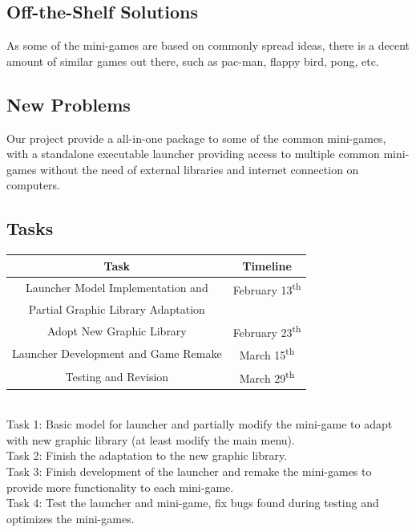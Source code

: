 \documentclass[12pt, titlepage]{article}
\begin{document}
\subsection{Off-the-Shelf Solutions}

As some of the mini-games are based on commonly spread ideas, there is a decent amount of similar games out there, such as pac-man, flappy bird, pong, etc.

\subsection{New Problems}

Our project provide a all-in-one package to some of the common mini-games, with a standalone executable launcher providing access to multiple common mini-games without the need of external libraries and internet connection on computers.

\subsection{Tasks}

\begin{center}
\begin{tabular}{ |c|c| } 
\hline
\textbf{Task} & \textbf{Timeline}\\
\hline
Launcher Model Implementation and  & February 13\textsuperscript{th}\\
Partial Graphic Library Adaptation &\\
\hline
Adopt New Graphic Library & February 23\textsuperscript{th}\\
\hline
Launcher Development and Game Remake & March 15\textsuperscript{th}\\
\hline
Testing and Revision & March 29\textsuperscript{th}\\
\hline
\end{tabular}
\end{center}

\textcolor{white}{...}\\ %
Task 1: Basic model for launcher and partially modify the mini-game to adapt with new graphic library (at least modify the main menu).\\
Task 2: Finish the adaptation to the new graphic library.\\
Task 3: Finish development of the launcher and remake the mini-games to provide more functionality to each mini-game.\\
Task 4: Test the launcher and mini-game, fix bugs found during testing and optimizes the mini-games.
\end{document}
